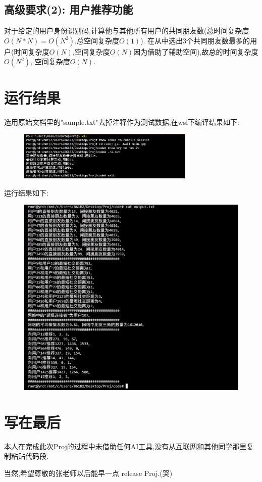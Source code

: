 \documentclass{article}
\begin{document}
\begin{CJK*}{UTF8}{gbsn}
\subsection{高级要求(2): 用户推荐功能}
\par 对于给定的用户身份识别码,计算他与其他所有用户的共同朋友数(总时间复杂度$O(N*N)=O(N^2)$,总空间复杂度$O(1)$).
在从中选出3个共同朋友数最多的用户(时间复杂度$O(N)$,空间复杂度$O(N)$因为借助了辅助空间),故总的时间复杂度$O(N^2)$,
空间复杂度$O(N)$.

\section{运行结果}
\par 选用原始文档里的"sample.txt"去掉注释作为测试数据,在wsl下编译结果如下:
\begin{figure}[H]
    \centering
    \includegraphics[width=0.75\textwidth]{compile.png}
\end{figure}
\par 运行结果如下:
\begin{figure}[H]
    \centering
    \includegraphics[width=1.0\textwidth]{run.png}
\end{figure}

\section{写在最后}
\par 本人在完成此次Proj的过程中未借助任何AI工具,没有从互联网和其他同学那里复制粘贴代码段.
\par 当然,希望尊敬的张老师以后能早一点 release Proj.(哭)

\end{CJK*}
\end{document}
